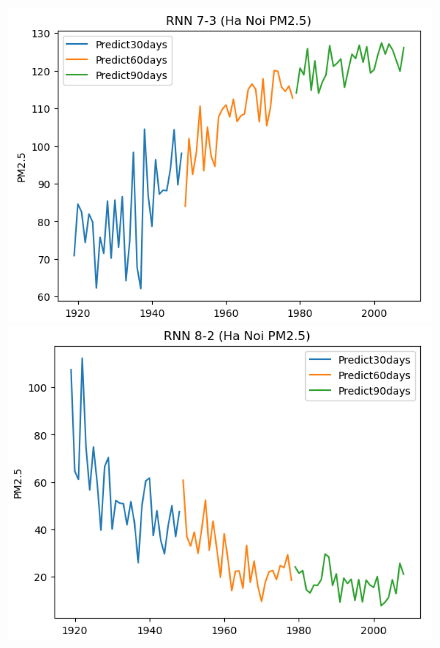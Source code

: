 
\begin{figure}[H]

    \centering
    \begin{minipage}{0.15\textwidth}
    \centering
    \end{minipage}
    \hfill

    \begin{minipage}{0.15\textwidth}
    \centering
    \includegraphics[width=1\textwidth]{img/final/RNN/90D/RNN_7_3_HN_90D.png}
    \end{minipage}
    \hfill
    \begin{minipage}{0.15\textwidth}
    \centering
    \includegraphics[width=1\textwidth]{img/final/RNN/90D/RNN_8_2_HN_90D.png}

\end{minipage}
\end{figure}
